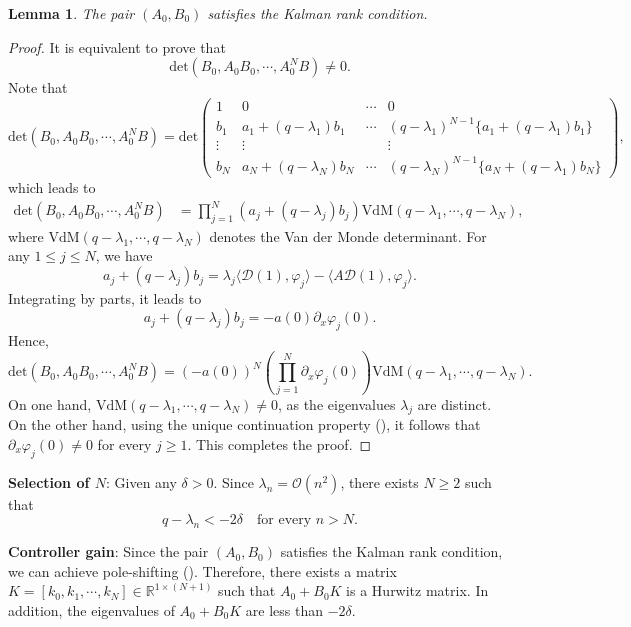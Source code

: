 \documentclass[review]{elsarticle}
\newtheorem{lemma}[theorem]{Lemma}
\numberwithin{equation}{section}
\begin{document}
\begin{lemma}
  The pair $ (A_0,B_0)$ satisfies the Kalman rank condition\footnotemark[3] .
\end{lemma}
\begin{proof}
    It is equivalent to prove that $$\text{det}(B_0, A_0 B_0, \cdots, A_0^{N} B)\neq 0.$$
    Note that
    $$
   \text{det}(B_0, A_0 B_0, \cdots, A_0^{N} B)=\text{det}\left(\begin{array}{cccc}
1  &0& \cdots &0 \\
b_1 &a_1+(q-\lambda_1)b_1& \cdots & (q-\lambda_1)^{N-1}\{a_1+(q-\lambda_1)b_1\} \\
\vdots  & \vdots & & \vdots\\
b_N&a_N+(q-\lambda_N)b_N&\cdots&(q-\lambda_N)^{N-1}\{a_N+(q-\lambda_1)b_N\}
\end{array}\right),$$
which leads to
\begin{equation*}
\begin{aligned}
\text{det}(B_0, A_0 B_0, \cdots, A_0^{N} B)&=\prod_{j=1}^{N}\left(a_j+(q-\lambda_j )b_j\right)\text{VdM}(q-\lambda_1,\cdots,q-\lambda_N),
\end{aligned}
\end{equation*}
where $\text{VdM}(q-\lambda_1,\cdots,q-\lambda_N)$ denotes the Van der Monde determinant. 
For any \( 1 \leq j \leq N \), we have
\[
a_j + (q - \lambda_j) b_j = \lambda_j \langle \mathcal{D}(1), \varphi_j \rangle - \langle A \mathcal{D}(1), \varphi_j\rangle.
\]
Integrating by parts, it leads to
\[
a_j + (q- \lambda_j) b_j = -a(0)\partial_x\varphi_j(0).
\]
Hence,
$$
\text{det}(B_0, A_0 B_0, \cdots, A_0^{N} B)=(-a(0))^N(\prod_{j=1}^{N}\partial_x\varphi_j(0)) \text{VdM}(q-\lambda_1,\cdots,q-\lambda_N) .
$$
On one hand, $\text{VdM}(q-\lambda_1,\cdots,q-\lambda_N)\neq 0$, as the eigenvalues $\lambda_j$ are distinct. On the other hand, using the unique continuation property (\cite[Corollary 15.2.2]{TW}), it follows that $\partial_x\varphi_j(0)\neq 0$ for every $j\ge 1$. This completes the proof.
\end{proof}

\noindent \textbf{Selection of $N$}: Given any
$\delta>0$. Since $\lambda_n=\mathcal{O}(n^2)$, there exists $N\ge 2$ such that
\begin{equation}
    \label{N-select}
    q-\lambda_n<-2\delta\quad \text{for every }n>N.
\end{equation}

\noindent \textbf{Controller gain}: Since the pair $ (A_0,B_0)$ satisfies the Kalman rank condition, we can achieve pole-shifting (\cite[Theorem 17]{TW}). Therefore, there exists a matrix $K=[k_0,k_1,\cdots,k_N]\in \mathbb{R}^{1\times (N+1)}$ such that $A_0+B_0K$ is a Hurwitz matrix. In addition, the eigenvalues of $A_0+B_0K$ are less than $-2\delta$.
\end{document}
